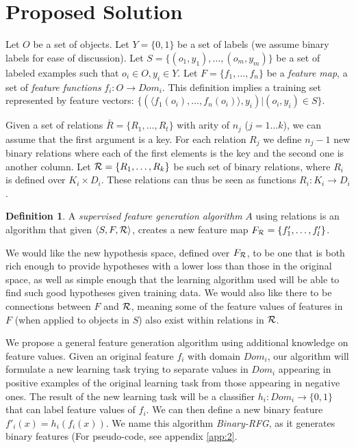 \documentclass[12pt, a4paper]{article}
\theoremstyle{definition}
\newtheorem{defn}{Definition}[section]
\begin{document}
\section{Proposed Solution}

Let $O$ be a set of objects. Let $Y=\{0,1\}$ be a set of labels (we assume binary labels for ease of discussion). Let $S=\{(o_{1},y_{1}),\ldots,(o_{m},y_{m})\}$ be a set of labeled examples such that $o_{i}\in O, y_{i}\in Y$. Let $F=\{f_{1},\ldots,f_{n}\}$ be a \emph{feature map}, a set of \emph{feature functions} $f_{i}:O\rightarrow Dom_{i}$.  This definition implies a training set represented by feature vectors: $\{ (\langle f_1(o_i),\ldots,f_n(o_i)\rangle, y_i) | (o_i,y_i) \in S\}$.

Given a set of relations $\bar{R}=\{R_{1},\ldots,R_{t}\}$ with arity of $n_{j}$ ($j=1\ldots k$), we can assume  that the first argument is a key. For each relation $R_{j}$ we define $n_{j}-1$ new binary relations where each of the first elements is the key and the second one is another column.
Let ${\cal R}=\{R_{1},\ldots,R_{k}\}$ be such set of binary relations, where $R_{i}$ is defined over $K_{i}\times D_{i}$. These relations can thus be seen as functions $R_{i}: K_{i}\rightarrow D_{i}$.

\begin{defn}
A \emph{supervised feature generation algorithm} $A$ using relations is an algorithm that given $\langle S,F,{\cal R} \rangle$, creates a new feature map $F_{\cal R}=\{f'_{1},\ldots,f'_{l}\}$.
\end{defn}

We would like the new hypothesis space, defined over $F_{\cal R}$, to be one that is both rich enough to provide hypotheses with a lower loss than those in the original space, as well as simple enough that the learning algorithm used will be able to find such good hypotheses given training data.
We would also like there to be connections between $F$ and ${\cal R}$, meaning some of the feature values of features in $F$ (when applied to objects in $S$) also exist within relations in $\cal R$.

We propose a general feature generation algorithm using additional knowledge on feature values.
Given an original feature $f_{i}$ with domain $Dom_i$, our algorithm will formulate a new learning task trying to separate values in $Dom_i$ appearing in positive examples of the original learning task from those appearing in negative ones.  The result of the new learning task will be a classifier
$h_{i}:Dom_{i}\rightarrow \{0,1\}$ that can label feature values of $f_{i}$. We can then define a new binary feature $f'_{i}(x)=h_{i}(f_{i}(x))$.
We name this algorithm \emph{Binary-RFG}, as it generates binary features (For pseudo-code, see appendix \ref{app:2}.
\end{document}
